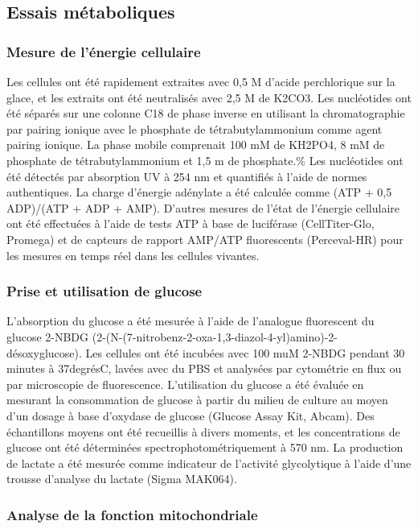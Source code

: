 \documentclass[11pt,a4paper]{article}
\begin{document}
\subsection{Essais métaboliques}

\subsubsection{Mesure de l'énergie cellulaire}

Les cellules ont été rapidement extraites avec 0,5 M d'acide perchlorique sur la glace, et les extraits ont été neutralisés avec 2,5 M de K2CO3. Les nucléotides ont été séparés sur une colonne C18 de phase inverse en utilisant la chromatographie par pairing ionique avec le phosphate de tétrabutylammonium comme agent pairing ionique. La phase mobile comprenait 100 mM de KH2PO4, 8 mM de phosphate de tétrabutylammonium et 1,5 m de phosphate.\% Les nucléotides ont été détectés par absorption UV à 254 nm et quantifiés à l'aide de normes authentiques. La charge d'énergie adénylate a été calculée comme (ATP + 0,5 ADP)/(ATP + ADP + AMP). D'autres mesures de l'état de l'énergie cellulaire ont été effectuées à l'aide de tests ATP à base de luciférase (CellTiter-Glo, Promega) et de capteurs de rapport AMP/ATP fluorescents (Perceval-HR) pour les mesures en temps réel dans les cellules vivantes.

\subsubsection{Prise et utilisation de glucose}

L'absorption du glucose a été mesurée à l'aide de l'analogue fluorescent du glucose 2-NBDG (2-(N-(7-nitrobenz-2-oxa-1,3-diazol-4-yl)amino)-2-désoxyglucose). Les cellules ont été incubées avec 100 muM 2-NBDG pendant 30 minutes à 37degrésC, lavées avec du PBS et analysées par cytométrie en flux ou par microscopie de fluorescence. L'utilisation du glucose a été évaluée en mesurant la consommation de glucose à partir du milieu de culture au moyen d'un dosage à base d'oxydase de glucose (Glucose Assay Kit, Abcam). Des échantillons moyens ont été recueillis à divers moments, et les concentrations de glucose ont été déterminées spectrophotométriquement à 570 nm. La production de lactate a été mesurée comme indicateur de l'activité glycolytique à l'aide d'une trousse d'analyse du lactate (Sigma MAK064).

\subsubsection{Analyse de la fonction mitochondriale}
\end{document}

